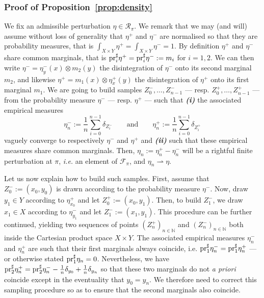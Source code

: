 \documentclass[leqno, 11pt, a4paper]{amsart}
\theoremstyle{definition}
\newcommand{\cR}{\mathcal{R}}
\newcommand{\N}{\mathbb{N}}
\newcommand{\cF}{\mathcal{F}}
\newcommand{\pr}{{\rm pr}}
\newcommand{\wto}{\rightharpoonup}
\begin{document}
\subsubsection{Proof of Proposition~\ref{prop:density}} We fix an admissible perturbation $\eta \in \cR_\pi$. We remark that we may (and will) assume without loss of generality that $\eta^+$ and $\eta^-$ are normalised so that they are probability measures, that is $\int_{X\times Y} \eta^+ = \int_{X\times Y} \eta^- = 1$. By definition $\eta^+$ and $\eta^-$ share common marginals, that is $\pr_i^\sharp \eta^+ =\pr_i^\sharp \eta^- := m_i$ for $i = 1, 2$. We can then write $\eta^- = \eta^-_{y}(x) \otimes m_2(y)$ the disintegration of $\eta^-$ onto its second marginal $m_2$, and likewise $\eta^+ = m_1(x) \otimes \eta^+_x(y)$ the disintegration of $\eta^+$ onto its first marginal $m_1$. We are going to build samples $Z_0^-, \dots, Z_{n-1}^-$ — resp. $Z_0^+, \dots, Z_{n-1}^+$ — from the probability measure $\eta^-$ — resp. $\eta^+$ — such that \textit{\textbf{(i)}} the associated empirical measures $$\eta^-_n := \frac1n\sum_{i=0}^{n-1} \delta_{Z_i^-} \qquad \text{and} \qquad \eta^+_n := \frac1n\sum_{i=0}^{n-1} \delta_{Z_i^+}$$ vaguely converge to respectively $\eta^-$ and $\eta^+$ and \textit{\textbf{(ii)}} such that these empirical measures share common marginals. Then, $\eta_n := \eta^+_n - \eta^-_n$ will be a rightful finite perturbation at $\pi$, \textit{i.e.} an element of $\cF_\pi$, and $\eta_n \wto \eta$.

Let us now explain how to build such samples. First, assume that $Z_0^- := (x_0, y_0)$ is drawn according to the probability measure $\eta^-$. Now, draw $y_1 \in Y$ according to $\eta^+_{x_0}$ and let $Z_0^+ := (x_0, y_1)$. Then, to build $Z_1^-$, we draw $x_1 \in X$ according to $\eta^-_{y_1}$ and let $Z_1^- := (x_1, y_1)$. This procedure can be further continued, yielding two sequences of points $(Z_n^+)_{n \in \N}$  and $(Z_n^-)_{n \in \N}$ both inside the Cartesian product space $X \times Y$. The associated empirical measures $\eta^-_n$ and $\eta^+_n$ are such that their first marginals always coincide, i.e. $\pr_1^\sharp \eta_n^- = \pr_1^\sharp \eta_n^+$ --- or otherwise stated $\pr_1^\sharp \eta_n = 0$. Nevertheless, we have $\pr_2^\sharp \eta^+_n = \pr_2^\sharp \eta^-_n - \frac1n \delta_{y_0} + \frac1n \delta_{y_{n}}$ so that these two marginals do not \textit{a priori} coincide except in the eventuality that $y_0 = y_{n}$. We therefore need to correct this sampling procedure so as to ensure that the second marginals also coincide. 
 
\end{document}
